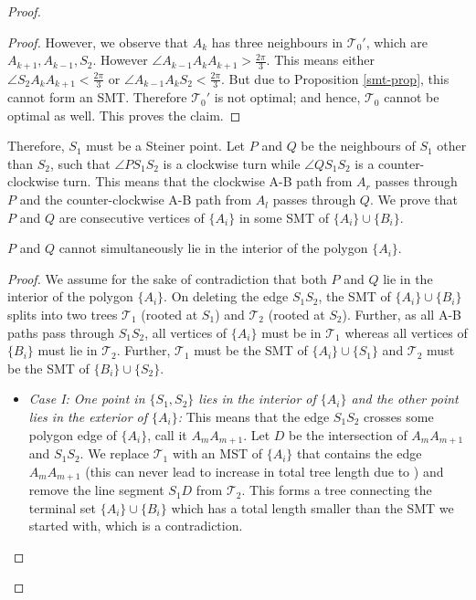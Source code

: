 \begin{proof}
\begin{proof}
    However, we observe that $A_k$ has three neighbours in $\mathcal T_0'$, which are $A_{k+1}, A_{k-1}, S_2$. However $\angle A_{k-1}A_kA_{k+1} > \frac{2 \pi}{3}$. This means either $\angle S_2A_kA_{k+1} < \frac{2 \pi}{3}$ or $\angle A_{k-1}A_kS_2 < \frac{2 \pi}{3}$. But due to Proposition \ref{smt-prop}, this cannot form an SMT. Therefore $\mathcal T_0'$ is not optimal; and hence, $\mathcal T_0$ cannot be optimal as well. This proves  the claim.
    \end{proof}

    Therefore, $S_1$ must be a Steiner point. Let $P$ and $Q$ be the neighbours of $S_1$ other than $S_2$, such that $\angle PS_1S_2$ is a clockwise turn while $\angle QS_1S_2$ is a counter-clockwise turn. This means that the clockwise A-B path from $A_r$ passes through $P$ and the counter-clockwise A-B path from $A_l$ passes through $Q$. We prove that $P$ and $Q$ are consecutive vertices of $\{A_i\}$ in some SMT of $\{A_i\} \cup \{B_i\}$.


    \begin{claim} \label{PQ_outside_A}
         $P$ and $Q$ cannot simultaneously lie in the interior of the polygon $\{A_i\}$. 
    \end{claim}
\begin{proof}
    We assume for the sake of contradiction that both $P$ and $Q$ lie in the interior of the polygon $\{A_i\}$. On deleting the edge $S_1S_2$, the SMT of $\{A_i\} \cup \{B_i\}$ splits into two trees $\mathcal T_1$ (rooted at $S_1$) and $\mathcal T_2$ (rooted at $S_2$). Further, as all A-B paths pass through $S_1S_2$, all vertices of $\{A_i\}$ must be in $\mathcal T_1$ whereas all vertices of $\{B_i\}$ must lie in  $\mathcal T_2$. Further, $\mathcal T_1$ must be the SMT of $\{A_i\} \cup \{S_1\}$ and $\mathcal T_2$ must be the SMT of $\{B_i\} \cup \{S_2\}$.

    \begin{itemize}
    \item \textit{Case I: One point in $\{S_1, S_2\}$ lies in the interior of $\{A_i\}$ and the other point lies in the exterior of $\{A_i\}$:} This means that the edge $S_1S_2$ crosses some polygon edge of $\{A_i\}$, call it $A_mA_{m+1}$. Let $D$ be the intersection of $A_mA_{m+1}$ and $S_1S_2$. We replace $\mathcal T_1$ with an MST of $\{A_i\}$ that contains the edge $A_mA_{m+1}$ (this can never lead to increase in total tree length due to \cite{weng1995steiner}) and remove the line segment $S_1D$ from $\mathcal T_2$. This forms a tree connecting the terminal set $\{A_i\} \cup \{B_i\}$ which has a total length smaller than the SMT we started with, which is a contradiction.
    

\end{itemize}
\end{proof}
\end{proof}
